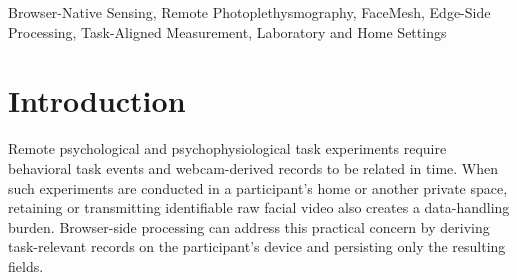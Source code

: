 \documentclass[dvipdfmx]{ehis}
\begin{document}
\begin{abstract}
Camerala is an edge-side, browser-native framework for remote psychophysiological experiments.
It synchronizes behavioral task events with face-image-derived records and exports local CSV/ZIP files without transmitting or storing raw facial video.
We examined an exploratory N=1 author-participant deployment comprising 10 sessions and 600 trials in laboratory and home settings.
Under the tested configuration, all planned sessions and trials were completed, and timestamped task-event and face-image-derived records were exported using the same browser clock domain.
The exported records showed descriptive laboratory/home differences in facial ROI green-channel values, head-motion estimates, and a frame-to-frame green-channel change indicator; these were interpreted only as deployment-context differences.
The findings are limited to the tested participant and configuration and do not establish validated physiological measurement or general performance across users, devices, and environments.
\end{abstract}

\begin{keyword}
Browser-Native Sensing, Remote Photoplethysmography, FaceMesh, Edge-Side Processing, Task-Aligned Measurement, Laboratory and Home Settings
\end{keyword}

\maketitle

\section{Introduction}

Remote psychological and psychophysiological task experiments require behavioral task events and webcam-derived records to be related in time.
When such experiments are conducted in a participant's home or another private space, retaining or transmitting identifiable raw facial video also creates a data-handling burden.
Browser-side processing can address this practical concern by deriving task-relevant records on the participant's device and persisting only the resulting fields.
\end{document}
